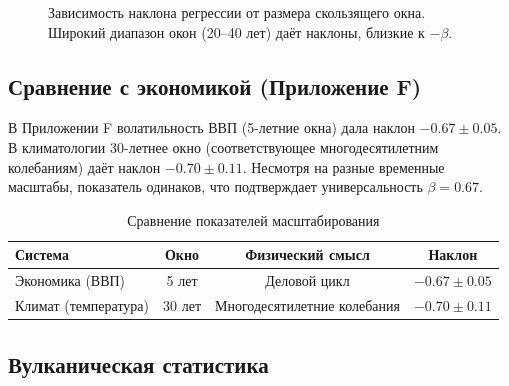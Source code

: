 \documentclass[12pt,a4paper]{article}
\newcommand{\be}{\beta}
\begin{document}
	\begin{figure}[htbp]
		\centering
		\caption{Зависимость наклона регрессии от размера скользящего окна. Широкий диапазон окон (20–40 лет) даёт наклоны, близкие к \(-\be\).}
		\label{fig:slope_vs_window}
	\end{figure}
	
	\subsection{Сравнение с экономикой (Приложение F)}
	
	В Приложении F волатильность ВВП (5-летние окна) дала наклон \(-0.67 \pm 0.05\). В климатологии 30-летнее окно (соответствующее многодесятилетним колебаниям) даёт наклон \(-0.70 \pm 0.11\). Несмотря на разные временные масштабы, показатель одинаков, что подтверждает универсальность \(\be = 0.67\).
	
	\begin{table}[htbp]
		\centering
		\caption{Сравнение показателей масштабирования}
		\label{tab:compare}
		\begin{tabular}{@{}lccc@{}}
			\toprule
			Система & Окно & Физический смысл & Наклон \\
			\midrule
			Экономика (ВВП) & 5 лет & Деловой цикл & \(-0.67 \pm 0.05\) \\
			Климат (температура) & 30 лет & Многодесятилетние колебания & \(-0.70 \pm 0.11\) \\
			\bottomrule
		\end{tabular}
	\end{table}
	
	\subsection{Вулканическая статистика}
	
\end{document}
